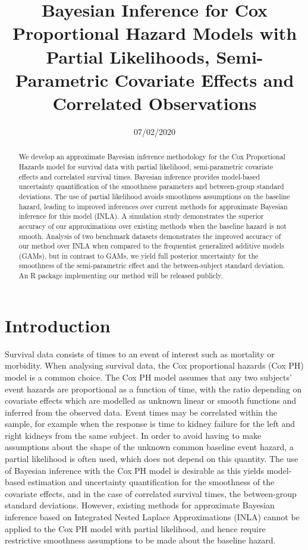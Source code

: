 \documentclass[]{article}
\title{{\myfont Bayesian Inference for Cox Proportional Hazard Models with Partial Likelihoods, Semi-Parametric Covariate Effects and Correlated Observations}}
\date{07/02/2020}
\begin{document}
	
\maketitle

\begin{abstract}
We develop an approximate Bayesian inference methodology for the Cox Proportional Hazards model for survival data with partial likelihood, semi-parametric covariate effects and correlated survival times. Bayesian inference provides model-based uncertainty quantification of the smoothness parameters and between-group standard deviations. The use of partial likelihood avoids smoothness assumptions on the baseline hazard, leading to improved inferences over current methods for approximate Bayesian inference for this model (INLA). A simulation study demonstrates the superior accuracy of our approximations over existing methods when the baseline hazard is not smooth. Analysis of two benchmark datasets demonstrates the improved accuracy of our method over INLA when compared to the frequentist generalized additive models (GAMs), but in contrast to GAMs, we yield full posterior uncertainty for the smoothness of the semi-parametric effect and the between-subject standard deviation. An R package implementing our method will be released publicly.
\end{abstract}


\section{Introduction}
Survival data consists of times to an event of interest such as mortality or morbidity.  When analysing survival data, the Cox proportional hazards (Cox PH) model is a common choice. The Cox PH model assumes that any two subjects' event hazards are proportional as a function of time, with the ratio depending on covariate effects which are modelled as unknown linear or smooth functions and inferred from the observed data. Event times may be correlated within the sample, for example when the response is time to kidney failure for the left and right kidneys from the same subject. In order to avoid having to make assumptions about the shape of the unknown common baseline event hazard, a partial likelihood is often used, which does not depend on this quantity. The use of Bayesian inference with the Cox PH model is desirable as this yields model-based estimation and uncertainty quantification for the smoothness of the covariate effects, and in the case of correlated survival times, the between-group standard deviations. However, existing methods for approximate Bayesian inference based on Integrated Nested Laplace Approximations (INLA) \citet{inla} cannot be applied to the Cox PH model with partial likelihood, and hence require restrictive smoothness assumptions to be made about the baseline hazard.
\end{document}
